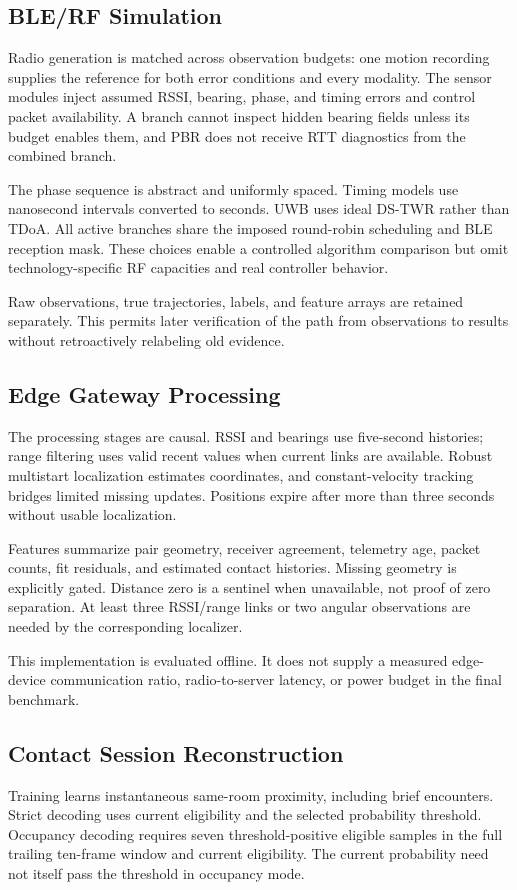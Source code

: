 \documentclass[12pt,a4paper]{report}
\begin{document}
\subsection{BLE/RF Simulation}
Radio generation is matched across observation budgets: one motion recording supplies the reference for both error conditions and every modality. The sensor modules inject assumed RSSI, bearing, phase, and timing errors and control packet availability. A branch cannot inspect hidden bearing fields unless its budget enables them, and PBR does not receive RTT diagnostics from the combined branch.

The phase sequence is abstract and uniformly spaced. Timing models use nanosecond intervals converted to seconds. UWB uses ideal DS-TWR rather than TDoA. All active branches share the imposed round-robin scheduling and BLE reception mask. These choices enable a controlled algorithm comparison but omit technology-specific RF capacities and real controller behavior.

Raw observations, true trajectories, labels, and feature arrays are retained separately. This permits later verification of the path from observations to results without retroactively relabeling old evidence.

\subsection{Edge Gateway Processing}
The processing stages are causal. RSSI and bearings use five-second histories; range filtering uses valid recent values when current links are available. Robust multistart localization estimates coordinates, and constant-velocity tracking bridges limited missing updates. Positions expire after more than three seconds without usable localization.

Features summarize pair geometry, receiver agreement, telemetry age, packet counts, fit residuals, and estimated contact histories. Missing geometry is explicitly gated. Distance zero is a sentinel when unavailable, not proof of zero separation. At least three RSSI/range links or two angular observations are needed by the corresponding localizer.

This implementation is evaluated offline. It does not supply a measured edge-device communication ratio, radio-to-server latency, or power budget in the final benchmark.

\subsection{Contact Session Reconstruction}
Training learns instantaneous same-room proximity, including brief encounters. Strict decoding uses current eligibility and the selected probability threshold. Occupancy decoding requires seven threshold-positive eligible samples in the full trailing ten-frame window and current eligibility. The current probability need not itself pass the threshold in occupancy mode.
\end{document}
